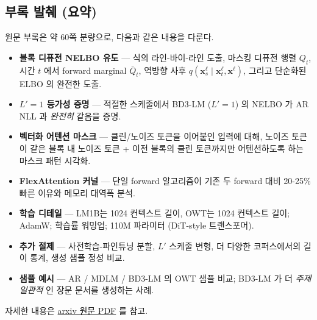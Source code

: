 \documentclass[
]{article}
\providecommand{\tightlist}{%
  \setlength{\itemsep}{0pt}\setlength{\parskip}{0pt}}
\begin{document}
\hypertarget{uxbd80uxb85d-uxbc1cuxcdcc-uxc694uxc57d}{%
\subsection{부록 발췌
(요약)}\label{uxbd80uxb85d-uxbc1cuxcdcc-uxc694uxc57d}}

원문 부록은 약 60쪽 분량으로, 다음과 같은 내용을 다룬다.

\begin{itemize}
\tightlist
\item
  \textbf{블록 디퓨전 NELBO 유도} --- 식의 라인-바이-라인 도출, 마스킹
  디퓨전 행렬 \(Q_t\), 시간 \(t\) 에서 forward marginal \(\bar{Q}_t\),
  역방향 사후
  \(q(\mathbf{x}^\ell_s \mid \mathbf{x}^\ell_t, \mathbf{x}^\ell)\),
  그리고 단순화된 ELBO 의 완전한 도출.
\item
  \textbf{\(L'=1\) 등가성 증명} --- 적절한 스케줄에서 BD3-LM (\(L'=1\))
  의 NELBO 가 AR NLL 과 \emph{완전히} 같음을 증명.
\item
  \textbf{벡터화 어텐션 마스크} --- 클린/노이즈 토큰을 이어붙인 입력에
  대해, 노이즈 토큰이 같은 블록 내 노이즈 토큰 + 이전 블록의 클린
  토큰까지만 어텐션하도록 하는 마스크 패턴 시각화.
\item
  \textbf{FlexAttention 커널} --- 단일 forward 알고리즘이 기존 두
  forward 대비 20-25\% 빠른 이유와 메모리 대역폭 분석.
\item
  \textbf{학습 디테일} --- LM1B는 1024 컨텍스트 길이, OWT는 1024
  컨텍스트 길이; AdamW; 학습률 워밍업; 110M 파라미터 (DiT-style
  트랜스포머).
\item
  \textbf{추가 절제} --- 사전학습-파인튜닝 분할, \(L'\) 스케줄 변형, 더
  다양한 코퍼스에서의 길이 통계, 생성 샘플 정성 비교.
\item
  \textbf{샘플 예시} --- AR / MDLM / BD3-LM 의 OWT 샘플 비교; BD3-LM 가
  더 \emph{주제 일관적} 인 장문 문서를 생성하는 사례.
\end{itemize}

자세한 내용은
\href{/compendium/papers/interpolating-ar-diffusion-lm-original.pdf}{arxiv
원문 PDF} 를 참고.
\end{document}

